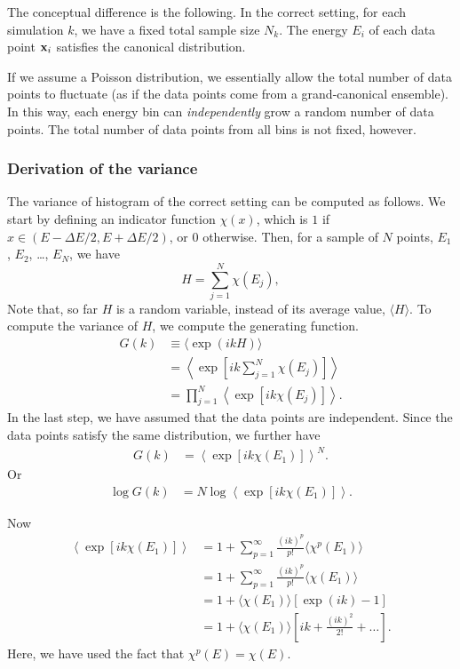 \documentclass[aip,jcp,preprint,notitlepage, superscriptaddress]{revtex4-1}
\begin{document}
The conceptual difference is the following.
%
In the correct setting,
for each simulation $k$,
we have a fixed total sample size $N_k$.
%
The energy $E_i$ of each data point $\mathbf{x}_i$
satisfies the canonical distribution.



If we assume a Poisson distribution,
we essentially allow the total number of data points
to fluctuate (as if the data points come from a grand-canonical ensemble).
%
In this way,
each energy bin can \emph{independently} grow
a random number of data points.
%
The total number of data points
from all bins is not fixed, however.



\subsubsection{Derivation of the variance}



The variance of histogram
of the correct setting
can be computed as follows.
%
We start by defining an indicator function $\chi(x)$,
which is $1$ if $x \in (E - \Delta E/2, E + \Delta E/2)$,
or $0$ otherwise.
%
Then, for a sample of $N$ points,
$E_1$, $E_2$, \dots, $E_N$,
we have
%
\[
  H = \sum_{j = 1}^N \chi( E_j ),
\]
%
Note that,
so far $H$ is a random variable,
instead of its average value, $\langle H \rangle$.
%
To compute the variance of $H$,
we compute the generating function\cite{vankampen}.
\begin{align*}
G(k)
&\equiv
\langle
  \exp( i k H )
\rangle
\\
&=
\left\langle
\exp\left[ i k \sum_{j = 1}^N \chi( E_j) \right]
\right\rangle
\\
&=
\prod_{j = 1}^N
\left\langle
\exp[ i k \chi( E_j) ]
\right\rangle.
\end{align*}
%
In the last step,
we have assumed that the data points are independent.
%
Since the data points
satisfy the same distribution,
we further have
\begin{align*}
G(k)
&=
  \left\langle
    \exp[ i k \chi( E_1) ]
  \right\rangle^N.
\end{align*}
%
Or
\begin{align*}
\log G(k)
&=
N \log
  \left\langle
    \exp[ i k \chi( E_1) ]
  \right\rangle
.
\end{align*}


Now
\begin{align*}
  \left\langle
    \exp[ i k \chi( E_1) ]
  \right\rangle
&=
  1 +
  \sum_{p = 1}^\infty
    \frac{ (i k)^p }{ p! }
    \langle
    \chi^p( E_1 )
    \rangle
\\
&=
  1  +
  \sum_{p = 1}^\infty
    \frac{ (i k)^p }{ p! }
    \langle
    \chi( E_1 )
    \rangle
\\
&=
  1
  +
  \langle
  \chi( E_1 )
  \rangle
  [\exp( i k ) - 1]
\\
&=
  1
  +
  \langle
  \chi( E_1 )
  \rangle
  \left[
  i k
  +
  \frac{ (i k)^2 } { 2! }
  + \dots
  \right].
\end{align*}
%
Here,
we have used the fact that
$\chi^p(E) = \chi(E)$.
\end{document}
